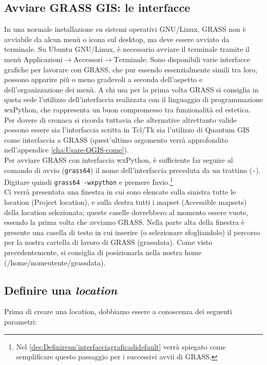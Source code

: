 	\subsection{\label{sub:Avviare-GRASS-GIS}Avviare GRASS GIS: le interfacce}
		In una normale installazione su sistemi operativi GNU/Linux, GRASS non è avviabile da alcun menù o icona sul desktop, ma deve essere avviato da terminale. Su Ubuntu GNU/Linux, è necessario avviare il terminale tramite il menù \textsf{$\text{Applicazioni}\rightarrow\text{Accessori}\rightarrow\text{Terminale}$}. Sono disponibili varie interfacce grafiche per lavorare con GRASS, che pur essendo essenzialmente simili tra loro, possono apparire più o meno gradevoli a seconda dell'aspetto e dell'organizzazione dei menù. A chi usa per la prima volta GRASS si consiglia in qusta sede l'utilizzo dell'interfaccia realizzata con il linguaggio di programmazione wxPython, che rappresenta un buon compromesso tra funzionalità ed estetica. Per dovere di cronaca si ricorda tuttavia che alternative altrettanto valide possono essere sia l'interfaccia scritta in Tcl/Tk sia l'utilizzo di Quantum GIS come interfaccia a GRASS (quest'ultimo argomento verrà approfondito nell'appendice \ref{cha:Usare-QGIS-come}).\\

		Per avviare GRASS con interfaccia wxPython, è sufficiente far seguire al comando di avvio (\texttt{grass64}) il nome dell'interfaccia preceduta da un trattino (\texttt{-}).\\

		Digitare quindi \texttt{grass64 -wxpython} e premere \textsf{Invio}.\footnote{Nel \textsection\ref{des:Definireun'interfacciagraficadidefault} verrà spiegato come semplificare questo passaggio per i successivi avvii di GRASS.}\\

		Ci verrà presentata una finestra in cui sono elencate sulla sinistra tutte le location (\textsf{Project location}), e sulla destra tutti i mapset (\textsf{Accessible mapsets}) della location selezionata; queste caselle dovrebbero al momento essere vuote, essendo la prima volta che avviamo GRASS. Nella parte alta della finestra è presente una casella di testo in cui inserire (o selezionare sfogliandolo) il percorso per la nostra cartella di lavoro di GRASS (\textsf{grassdata}). Come visto precedentemente, si consiglia di posizionarla nella nostra home (\textsf{/home/nomeutente/grassdata}).


	\subsection{Definire una \emph{location\label{sub:Definire-una-location}}}
		Prima di creare una location, dobbiamo essere a conoscenza dei seguenti parametri:
		
